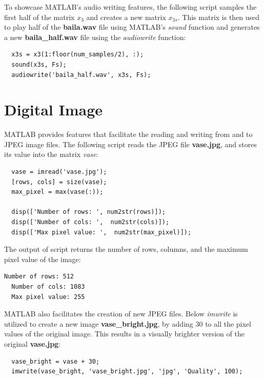 \documentclass[a4paper, 10pt]{article}
\begin{document}
\hfill

\noindent To showcase MATLAB's audio writing features, the following script samples the first half of the matrix 
$x_3$ and creates a new matrix $x_{3s}$. This matrix is then used to play half of the \textbf{baila.wav} file 
using MATLAB's \textit{sound} function and generates a new \textbf{baila\_half.wav} file using the
\textit{audiowrite} function:
\begin{lstlisting}[style=Matlab-editor, basicstyle=\small\ttfamily]
  %% Get x3s, play it, and create baila_half.wav
  x3s = x3(1:floor(num_samples/2), :);
  sound(x3s, Fs);
  audiowrite('baila_half.wav', x3s, Fs);  
\end{lstlisting}

\section{Digital Image}
MATLAB provides features that facilitate the reading and writing from and to JPEG image files.
The following script reads the JPEG file \textbf{vase.jpg}, and stores its value into the matrix \textit{vase}:
\begin{lstlisting}[style=Matlab-editor, basicstyle=\small\ttfamily]
  %% read the jpg file and get metrics
  vase = imread('vase.jpg');
  [rows, cols] = size(vase);
  max_pixel = max(vase(:));
  
  disp(['Number of rows: ', num2str(rows)]);
  disp(['Number of cols: ',  num2str(cols)]);
  disp(['Max pixel value: ',  num2str(max_pixel)]);
\end{lstlisting}
The output of script returns the number of rows, columns, and the maximum pixel value of the image:
\begin{lstlisting}[basicstyle=\small\ttfamily]
  Number of rows: 512
  Number of cols: 1083
  Max pixel value: 255
\end{lstlisting}
MATLAB also facilitates the creation of new JPEG files. Below \textit{imwrite} is utilized to create a new
image \textbf{vase\_bright.jpg}, by adding 30 to all the pixel values of the original image.
This results in a visually brighter version of the original \textbf{vase.jpg}:
\begin{lstlisting}[style=Matlab-editor, basicstyle=\small\ttfamily]
  %% create the new bright jpg
  vase_bright = vase + 30;
  imwrite(vase_bright, 'vase_bright.jpg', 'jpg', 'Quality', 100);
\end{lstlisting}
\end{document}

